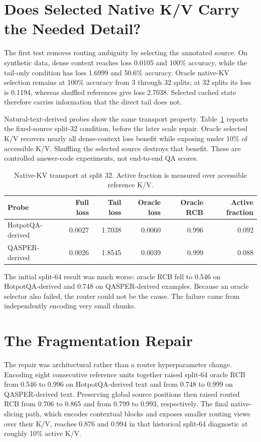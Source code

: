 \documentclass[11pt]{article}
\begin{document}
\section{Does Selected Native K/V Carry the Needed Detail?}
\label{sec:transport}

The first test removes routing ambiguity by selecting the annotated source.
On synthetic data, dense context reaches loss 0.0105 and 100\% accuracy,
while the tail-only condition has loss 1.6999 and 50.6\% accuracy.
Oracle native-KV selection remains at 100\% accuracy from 3 through 32 splits;
at 32 splits its loss is 0.1194, whereas shuffled references give loss 2.7038.
Selected cached state therefore carries information that the direct tail does not.

Natural-text-derived probes show the same transport property.
Table~\ref{tab:transport} reports the fixed-source split-32 condition,
before the later scale repair. Oracle selected K/V recovers nearly all dense-context
loss benefit while exposing under 10\% of accessible K/V.
Shuffling the selected source destroys that benefit.
These are controlled answer-code experiments, not end-to-end QA scores.

\begin{table}[H]
\centering
\small
\caption{Native-KV transport at split 32. Active fraction is measured over accessible
reference K/V.}
\label{tab:transport}
\begin{tabular}{lrrrrr}
\toprule
Probe & Full loss & Tail loss & Oracle loss & Oracle RCB & Active fraction \\
\midrule
HotpotQA-derived & 0.0027 & 1.7038 & 0.0060 & 0.996 & 0.092 \\
QASPER-derived   & 0.0026 & 1.8545 & 0.0039 & 0.999 & 0.088 \\
\bottomrule
\end{tabular}
\end{table}

The initial split-64 result was much worse: oracle RCB fell to 0.546 on HotpotQA-derived
and 0.748 on QASPER-derived examples. Because an oracle selector also failed,
the router could not be the cause. The failure came from independently encoding very
small chunks.

\section{The Fragmentation Repair}
\label{sec:fragmentation}

The repair was architectural rather than a router hyperparameter change.
Encoding eight consecutive reference units together raised split-64 oracle RCB from
0.546 to 0.996 on HotpotQA-derived text and from 0.748 to 0.999 on QASPER-derived text.
Preserving global source positions then raised routed RCB from 0.706 to 0.865 and from
0.799 to 0.993, respectively. The final native-slicing path,
which encodes contextual blocks and exposes smaller routing views over their K/V,
reaches 0.876 and 0.994 in that historical split-64 diagnostic at roughly 10\% active
K/V.
\end{document}
